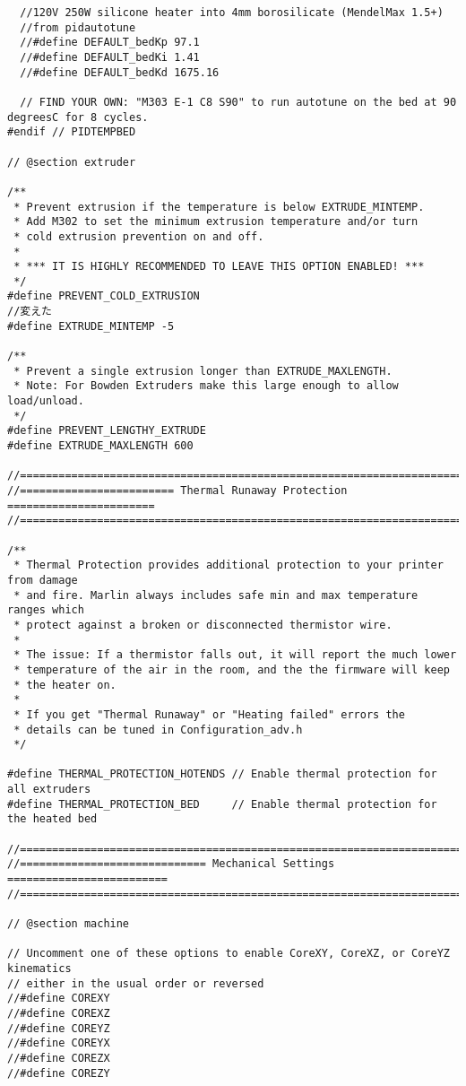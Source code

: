 \begin{lstlisting}
  //120V 250W silicone heater into 4mm borosilicate (MendelMax 1.5+)
  //from pidautotune
  //#define DEFAULT_bedKp 97.1
  //#define DEFAULT_bedKi 1.41
  //#define DEFAULT_bedKd 1675.16

  // FIND YOUR OWN: "M303 E-1 C8 S90" to run autotune on the bed at 90 degreesC for 8 cycles.
#endif // PIDTEMPBED

// @section extruder

/**
 * Prevent extrusion if the temperature is below EXTRUDE_MINTEMP.
 * Add M302 to set the minimum extrusion temperature and/or turn
 * cold extrusion prevention on and off.
 *
 * *** IT IS HIGHLY RECOMMENDED TO LEAVE THIS OPTION ENABLED! ***
 */
#define PREVENT_COLD_EXTRUSION
//変えた
#define EXTRUDE_MINTEMP -5

/**
 * Prevent a single extrusion longer than EXTRUDE_MAXLENGTH.
 * Note: For Bowden Extruders make this large enough to allow load/unload.
 */
#define PREVENT_LENGTHY_EXTRUDE
#define EXTRUDE_MAXLENGTH 600

//===========================================================================
//======================== Thermal Runaway Protection =======================
//===========================================================================

/**
 * Thermal Protection provides additional protection to your printer from damage
 * and fire. Marlin always includes safe min and max temperature ranges which
 * protect against a broken or disconnected thermistor wire.
 *
 * The issue: If a thermistor falls out, it will report the much lower
 * temperature of the air in the room, and the the firmware will keep
 * the heater on.
 *
 * If you get "Thermal Runaway" or "Heating failed" errors the
 * details can be tuned in Configuration_adv.h
 */

#define THERMAL_PROTECTION_HOTENDS // Enable thermal protection for all extruders
#define THERMAL_PROTECTION_BED     // Enable thermal protection for the heated bed

//===========================================================================
//============================= Mechanical Settings =========================
//===========================================================================

// @section machine

// Uncomment one of these options to enable CoreXY, CoreXZ, or CoreYZ kinematics
// either in the usual order or reversed
//#define COREXY
//#define COREXZ
//#define COREYZ
//#define COREYX
//#define COREZX
//#define COREZY


\end{lstlisting}
